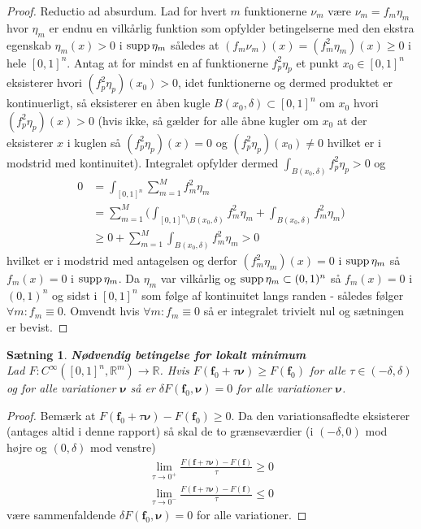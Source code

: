 \documentclass[12pt]{article}
\newtheorem{thm}{Sætning}
\begin{document}
\begin{proof} Reductio ad absurdum. Lad for hvert $m$ funktionerne $\nu_m $ være $\nu_m = f_m \eta_m$ hvor $\eta_m$ er endnu en vilkårlig funktion som opfylder betingelserne med den ekstra egenskab $\eta_m(x) >0$ i $\textnormal{supp}\, \eta_m$ således at $(f_m \nu_m)(x) = (f^2_m \eta_m)(x) \geq 0$ i hele $[0,1]^n$. Antag at for mindst en af funktionerne $f^2_p \eta_p$ et punkt $x_0 \in [0,1]^n$  eksisterer hvori $(f^2_p \eta_p)(x_0)>0$, idet funktionerne og dermed produktet er kontinuerligt, så eksisterer en åben kugle $B(x_0,\delta) \subset [0,1]^n$ om $x_0$ hvori $(f^2_p \eta_p)(x)>0$ (hvis ikke, så gælder for alle åbne kugler om $x_0$ at der eksisterer $x$ i kuglen så $(f^2_p \eta_p)(x)=0$ og $(f^2_p \eta_p)(x_0) \neq 0$ hvilket er i modstrid med kontinuitet). Integralet opfylder dermed $\int_{ B(x_0,\delta)} f^2_p \eta_p > 0$ og
\begin{align*}
0&=\int_{[0,1]^n} \sum_{m=1}^M f^2_m \eta_m  \\
&=\sum_{m=1}^M \Big(\int_{[0,1]^n\setminus B(x_0,\delta)}f^2_m \eta_m + \int_{ B(x_0,\delta)} f^2_m \eta_m \Big) \\
&\geq 0+\sum_{m=1}^M\int_{ B(x_0,\delta)} f^2_m \eta_m > 0
\end{align*}
hvilket er i modstrid med antagelsen og derfor $(f^2_m \eta_m)(x)= 0$ i $\textnormal{supp}\, \eta_m$ så $f_m(x) = 0$ i $\textnormal{supp}\, \eta_m$. Da $\eta_m$ var vilkårlig og $\textnormal{supp}\, \eta_m \subset (0,1)^n$ så $f_m(x) = 0$ i $(0,1)^n$ og sidst i $[0,1]^n$ som følge af kontinuitet langs randen - således følger $\forall m : f_m \equiv 0$. Omvendt hvis $\forall m : f_m \equiv 0$ så er integralet trivielt nul og sætningen er bevist.
\end{proof}


\begin{thm} {\bf Nødvendig betingelse for lokalt minimum}\\
Lad $F : C^\infty ([0,1]^n, \mathbb{R}^m) \to \mathbb{R}$. Hvis $F(\mathbf{f}_0+\tau {\boldsymbol \nu}) \geq F(\mathbf{f}_0)$ for alle $\tau\in (-\delta, \delta)$ og for alle variationer ${\boldsymbol \nu}$ så er $\delta F(\mathbf{f}_0, {\boldsymbol \nu})=0$ for alle variationer ${\boldsymbol \nu}$.
\end{thm}
\begin{proof} Bemærk at $F(\mathbf{f}_0+\tau {\boldsymbol \nu}) - F(\mathbf{f}_0) \geq 0$. Da den variationsafledte eksisterer (antages altid i denne rapport) så skal de to grænseværdier (i $(-\delta,0)$ mod højre og $(0,\delta)$ mod venstre)
\begin{align*}
\lim_{\tau \to 0^+} \frac{F(\mathbf{f}+\tau{\boldsymbol \nu})-F(\mathbf{f})}{\tau} \geq 0 \\
\lim_{\tau \to 0^-} \frac{F(\mathbf{f}+\tau{\boldsymbol \nu})-F(\mathbf{f})}{\tau} \leq 0
\end{align*}
være sammenfaldende $\delta F(\mathbf{f}_0, {\boldsymbol \nu})=0$ for alle variationer.
\end{proof}
\end{document}
